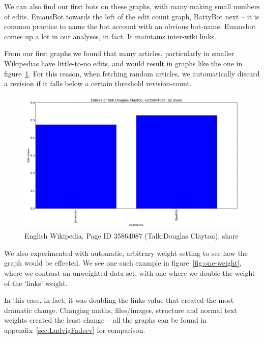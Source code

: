 We can also find our first bots on these graphs, with many making
small numbers of edits. EmausBot towards the left of the edit count
graph, BattyBot next -- it is common practice to name the bot account
with an obvious bot-name. Emausbot comes up a lot in our analyses, in
fact. It maintains inter-wiki links.

From our first graphs we found that many articles, particularly in
smaller Wikipedias have little-to-no edits, and would result in graphs
like the one in figure~\ref{fig:useless-share}. For this reason, when
fetching random articles, we automatically discard a revision if it
falls below a certain threshold revision-count.

\begin{figure}
  \includegraphics[width=1\linewidth]{img/useless/Talk:DouglasClayton.png}
  \caption{English Wikipedia, Page ID 35864087 (Talk:Douglas
    Clayton), share}
  \label{fig:useless-share}
\end{figure}

We also experimented with automatic, arbitrary weight setting to see
how the graph would be effected. We see one such example in
figure~\ref{fig:one-weight}, where we contrast an unweighted data set,
with one where we double the weight of the `links' weight.

In this case, in fact, it was doubling the links value that created
the most dramatic change. Changing maths, files/images, structure and
normal text weights created the least change -- all the graphs can be
found in appendix~\ref{sec:LudvigFadeev} for comparison.

